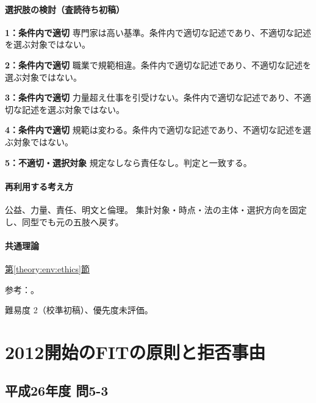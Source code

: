 \paragraph{選択肢の検討（査読待ち初稿）}\mbox{}\par

\noindent\textbf{1：条件内で適切} 専門家は高い基準。条件内で適切な記述であり、不適切な記述を選ぶ対象ではない。\par

\noindent\textbf{2：条件内で適切} 職業で規範相違。条件内で適切な記述であり、不適切な記述を選ぶ対象ではない。\par

\noindent\textbf{3：条件内で適切} 力量超え仕事を引受けない。条件内で適切な記述であり、不適切な記述を選ぶ対象ではない。\par

\noindent\textbf{4：条件内で適切} 規範は変わる。条件内で適切な記述であり、不適切な記述を選ぶ対象ではない。\par

\noindent\textbf{5：不適切・選択対象} 規定なしなら責任なし。判定と一致する。\par

\paragraph{再利用する考え方} 公益、力量、責任、明文と倫理。 集計対象・時点・法の主体・選択方向を固定し、同型でも元の五肢へ戻す。

\paragraph{共通理論} \hyperref[theory:env:ethics]{第\ref*{theory:env:ethics}節}

\par 参考：\cite{ipej_ethics2011}。

\par 難易度 2（校準初稿）、優先度未評価。

\section{2012開始のFITの原則と拒否事由}

\subsection{平成26年度 問5-3}
\label{q:h26-reg-basic-5-3}

